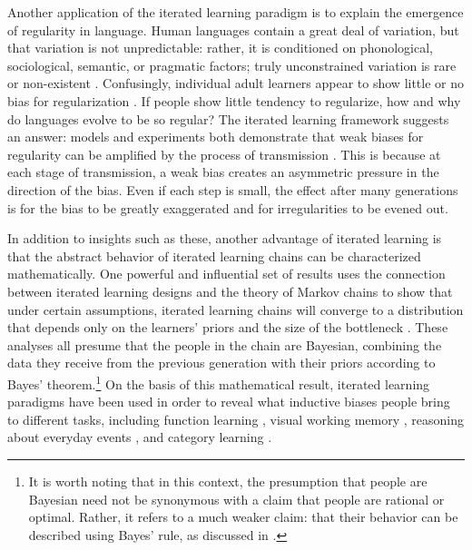 \documentclass[doc]{apa6}
\begin{document}
Another application of the iterated learning paradigm is to explain the emergence of regularity in language. Human languages contain a great deal of variation, but that variation is not unpredictable: rather, it is conditioned on phonological, sociological, semantic, or pragmatic factors; truly unconstrained variation is rare or non-existent \parencite{givon85,chambersetal03}. Confusingly, individual adult learners appear to show little or no bias for regularization \parencite{hudsonkamnewport05,vouloumanos08}. If people show little tendency to regularize, how and why do languages evolve to be so regular? The iterated learning framework suggests an answer: models and experiments both demonstrate that weak biases for regularity can be amplified by the process of transmission \parencite{realigriffiths09,smithwonnacott10,smithetal16,morganlevy16}. This is because at each stage of transmission, a weak bias creates an asymmetric pressure in the direction of the bias. Even if each step is small, the effect after many generations is for the bias to be greatly exaggerated and for irregularities to be evened out.

In addition to insights such as these, another advantage of iterated learning is that the abstract behavior of iterated learning chains can be characterized mathematically. One powerful and influential set of results uses the connection between iterated learning designs and the theory of Markov chains to show that under certain assumptions, iterated learning chains will converge to a distribution that depends only on the learners' priors and the size of the bottleneck \parencite{griffiths_language_2007,raffertyetal14}. These analyses all presume that the people in the chain are Bayesian, combining the data they receive from the previous generation with their priors according to Bayes' theorem.\footnote{It is worth noting that in this context, the presumption that people are Bayesian need not be synonymous with a claim that people are rational or optimal. Rather, it refers to a much weaker claim: that their behavior can be described using Bayes' rule, as discussed in \textcite{TauberBIRP}.} On the basis of this mathematical result, iterated learning paradigms have been used in order to reveal what inductive biases people bring to different tasks, including function learning \parencite{kalish_iterated_2007}, visual working memory \parencite{lewvul15}, reasoning about everyday events \parencite{lewandowskyetal09}, and category learning \parencite{caninietal14}.
\end{document}
